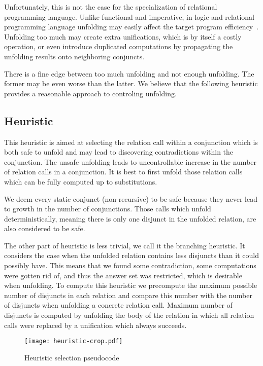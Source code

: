 Unfortunately, this is not the case for the specialization of relational programming language.
Unlike functional and imperative, in logic and relational programming language unfolding may easily affect the target program efficiency~\cite{leuschel2002logic}.
Unfolding too much may create extra unifications, which is by itself a costly operation, or even introduce duplicated computations by propagating the unfolding results onto neighboring conjuncts.

There is a fine edge between too much unfolding and not enough unfolding.
The former may be even worse than the latter.
We believe that the following heuristic provides a reasonable approach to controling unfolding.

\subsection{Heuristic}

This heuristic is aimed at selecting the relation call within a conjunction which is both safe to unfold and may lead to discovering contradictions within the conjunction.
The unsafe unfolding leads to uncontrollable increase in the number of relation calls in a conjunction.
It is best to first unfold those relation calls which can be fully computed up to substitutions.

We deem every static conjunct (non-recursive) to be safe because they never lead to growth in the number of conjunctions.
Those calls which unfold deterministically, meaning there is only one disjunct in the unfolded relation, are also considered to be safe.

The other part of heuristic is less trivial, we call it the branching heuristic.
It considers the case when the unfolded relation contains less disjuncts than it could possibly have.
This means that we found some contradiction, some computations were gotten rid of, and thus the answer set was restricted, which is desirable when unfolding.
To compute this heuristic we precompute the maximum possible number of disjuncts in each relation and compare this number with the number of disjuncts when unfolding a concrete relation call.
Maximum number of disjuncts is computed by unfolding the body of the relation in which all relation calls were replaced by a unification which always succeeds.


\begin{figure}[h!]
  \centering
  \texttt{[image: heuristic-crop.pdf]}
  \caption{Heuristic selection pseudocode}
  \label{fig:heu-pseudo}
\end{figure}

